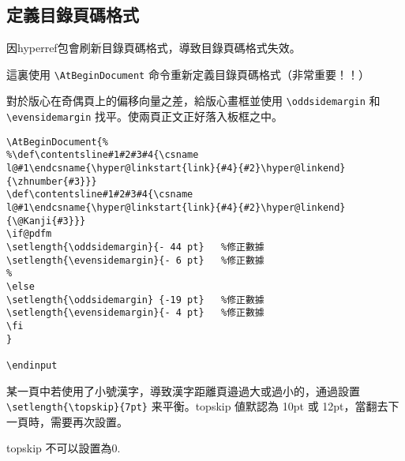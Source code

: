 \subsection{定義目錄頁碼格式}
\par%
因hyperref包會刷新目錄頁碼格式，導致目錄頁碼格式失效。
\par%
這裏使用 \verb+\AtBeginDocument+ 命令重新定義目錄頁碼格式（非常重要！！）

\par%
對於版心在奇偶頁上的偏移向量之差，給版心畫框並使用 \verb+\oddsidemargin+ 和 \verb+\evensidemargin+ 
找平。使兩頁正文正好落入板框之中。


\begin{lstlisting}[firstnumber=1648]
\AtBeginDocument{%
%\def\contentsline#1#2#3#4{\csname l@#1\endcsname{\hyper@linkstart{link}{#4}{#2}\hyper@linkend}{\zhnumber{#3}}}
\def\contentsline#1#2#3#4{\csname l@#1\endcsname{\hyper@linkstart{link}{#4}{#2}\hyper@linkend}{\@Kanji{#3}}}
\if@pdfm
\setlength{\oddsidemargin}{- 44 pt}   %修正數據
\setlength{\evensidemargin}{- 6 pt}   %修正數據
%
\else
\setlength{\oddsidemargin} {-19 pt}   %修正數據
\setlength{\evensidemargin}{- 4 pt}   %修正數據
\fi
}

\endinput
\end{lstlisting}


某一頁中若使用了小號漢字，導致漢字距離頁邉過大或過小的，通過設置 \\
\verb+\setlength{\topskip}{7pt}+ 来平衡。topskip 値默認為 10pt 或 12pt，當翻去下一頁時，需要再次設置。


topskip 不可以設置為0.





\endinput